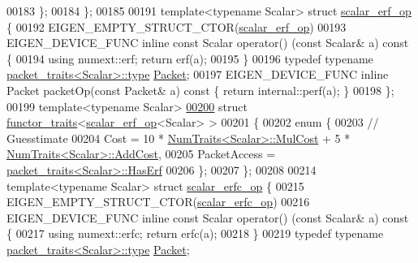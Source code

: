 \begin{DoxyCode}
00183     \};
00184 \};
00185 
00191 \textcolor{keyword}{template}<\textcolor{keyword}{typename} Scalar> \textcolor{keyword}{struct }\hyperlink{struct_eigen_1_1internal_1_1scalar__erf__op}{scalar\_erf\_op} \{
00192   EIGEN\_EMPTY\_STRUCT\_CTOR(\hyperlink{struct_eigen_1_1internal_1_1scalar__erf__op}{scalar\_erf\_op})
00193   EIGEN\_DEVICE\_FUNC \textcolor{keyword}{inline} \textcolor{keyword}{const} Scalar operator() (\textcolor{keyword}{const} Scalar& a)\textcolor{keyword}{ const }\{
00194     \textcolor{keyword}{using} numext::erf; \textcolor{keywordflow}{return} erf(a);
00195   \}
00196   \textcolor{keyword}{typedef} \textcolor{keyword}{typename} \hyperlink{struct_eigen_1_1internal_1_1packet__traits}{packet\_traits<Scalar>::type} \hyperlink{union_eigen_1_1internal_1_1_packet}{Packet};
00197   EIGEN\_DEVICE\_FUNC \textcolor{keyword}{inline} Packet packetOp(\textcolor{keyword}{const} Packet& a)\textcolor{keyword}{ const }\{ \textcolor{keywordflow}{return} internal::perf(a); \}
00198 \};
00199 \textcolor{keyword}{template}<\textcolor{keyword}{typename} Scalar>
\hyperlink{struct_eigen_1_1internal_1_1functor__traits_3_01scalar__erf__op_3_01_scalar_01_4_01_4}{00200} \textcolor{keyword}{struct }\hyperlink{struct_eigen_1_1internal_1_1functor__traits}{functor\_traits}<\hyperlink{struct_eigen_1_1internal_1_1scalar__erf__op}{scalar\_erf\_op}<Scalar> >
00201 \{
00202   \textcolor{keyword}{enum} \{
00203     \textcolor{comment}{// Guesstimate}
00204     Cost = 10 * \hyperlink{group___core___module_struct_eigen_1_1_num_traits}{NumTraits<Scalar>::MulCost} + 5 * 
      \hyperlink{group___core___module_struct_eigen_1_1_num_traits}{NumTraits<Scalar>::AddCost},
00205     PacketAccess = \hyperlink{struct_eigen_1_1internal_1_1packet__traits}{packet\_traits<Scalar>::HasErf}
00206   \};
00207 \};
00208 
00214 \textcolor{keyword}{template}<\textcolor{keyword}{typename} Scalar> \textcolor{keyword}{struct }\hyperlink{struct_eigen_1_1internal_1_1scalar__erfc__op}{scalar\_erfc\_op} \{
00215   EIGEN\_EMPTY\_STRUCT\_CTOR(\hyperlink{struct_eigen_1_1internal_1_1scalar__erfc__op}{scalar\_erfc\_op})
00216   EIGEN\_DEVICE\_FUNC \textcolor{keyword}{inline} \textcolor{keyword}{const} Scalar operator() (\textcolor{keyword}{const} Scalar& a)\textcolor{keyword}{ const }\{
00217     \textcolor{keyword}{using} numext::erfc; \textcolor{keywordflow}{return} erfc(a);
00218   \}
00219   \textcolor{keyword}{typedef} \textcolor{keyword}{typename} \hyperlink{struct_eigen_1_1internal_1_1packet__traits}{packet\_traits<Scalar>::type} \hyperlink{union_eigen_1_1internal_1_1_packet}{Packet};

\end{DoxyCode}
